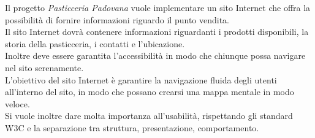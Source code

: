 Il progetto \emph{Pasticceria Padovana} vuole implementare un sito Internet che offra la possibilità di fornire informazioni riguardo il punto vendita.\\
Il sito Internet dovrà contenere informazioni riguardanti i prodotti disponibili, la storia della pasticceria, i contatti e l'ubicazione.\\
Inoltre deve essere garantita l'accessibilità in modo che chiunque possa navigare nel sito serenamente.\\
L'obiettivo del sito Internet è garantire la navigazione fluida degli utenti all'interno del sito, in modo che possano crearsi una mappa mentale in modo veloce. \\
Si vuole inoltre dare molta importanza all'usabilità, rispettando gli standard W3C e la separazione tra struttura, presentazione, comportamento.
